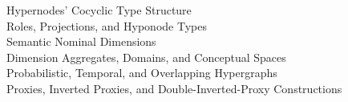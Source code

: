 

\begin{description}

\item[Hypernodes' Cocyclic Type Structure]

\item[Roles, Projections, and Hyponode Types]

\item[Semantic Nominal Dimensions]

\item[Dimension Aggregates, Domains, and Conceptual Spaces]

\item[Probabilistic, Temporal, and Overlapping Hypergraphs]

\item[Proxies, Inverted Proxies, and Double-Inverted-Proxy Constructions]







\end{description}


\p{}

\p{}

\p{}

